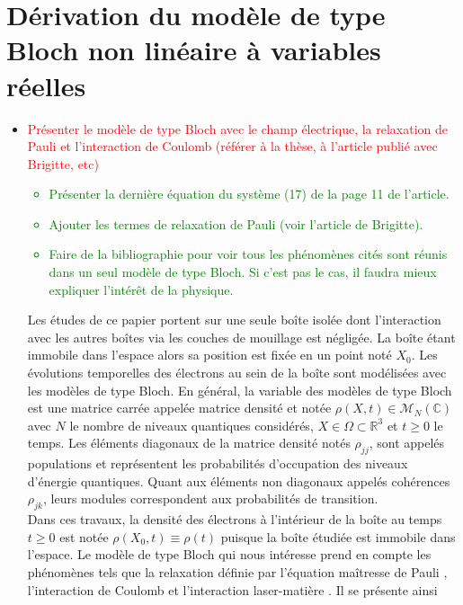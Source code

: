 \documentclass[a4paper]{article}
\begin{document}
\section{Dérivation du modèle de type Bloch non linéaire à variables réelles }
\begin{itemize}
\item \textcolor{red}{Présenter le modèle de type Bloch avec le champ électrique, la relaxation de Pauli et l'interaction de Coulomb (référer à la thèse, à l'article publié avec Brigitte, etc)}
\textcolor{green}{\begin{itemize}
\item Présenter la dernière équation du système (17) de la page 11 de l'article.
\item Ajouter les termes de relaxation de Pauli  (voir l'article de Brigitte).
\item Faire de la bibliographie pour voir tous les phénomènes cités sont réunis dans un seul modèle de type Bloch. Si c'est pas le cas, il faudra mieux expliquer l'intérêt de la physique.  
\end{itemize}}
Les études de ce papier portent sur une seule boîte isolée dont l'interaction avec les autres boîtes  via les couches de mouillage est négligée.
La boîte étant immobile dans l'espace alors sa position est fixée en un point noté $X_0$. Les évolutions temporelles des électrons au sein de la boîte sont modélisées avec les modèles de type Bloch. En général, la variable des modèles de type Bloch est une matrice carrée appelée matrice densité et notée $\rho(X,t) \in \mathcal{M}_N (\mathbb{C})$ avec $N$ le nombre de niveaux quantiques considérés, $X\in \Omega\subset \mathbb{R}^3$ et  $t \geq 0$ le temps. Les éléments diagonaux de la matrice densité notés $\rho_{jj}$, sont appelés populations et représentent les probabilités d'occupation des niveaux d'énergie quantiques. Quant aux éléments non diagonaux appelés cohérences $\rho_{jk}$, leurs modules correspondent aux probabilités de transition.
\\Dans ces travaux, la densité des électrons à l'intérieur de la boîte au temps $t \geq 0$ est notée $\rho(X_0,t)\equiv \rho(t)$ puisque la boîte étudiée est immobile dans l'espace. Le modèle de type Bloch qui nous intéresse prend en compte les phénomènes tels que la relaxation définie par l'équation maîtresse de Pauli \cite{Bidegaray-Bourgeade-Reignier01,Keita-Dicko24}, l'interaction de Coulomb \cite{Lindberg-Koch88, Bidegaray-Keita14}  et l'interaction laser-matière \cite{Lindberg-Koch88, Bidegaray-Keita14}.   Il se présente ainsi 

\end{itemize}
\end{document}
